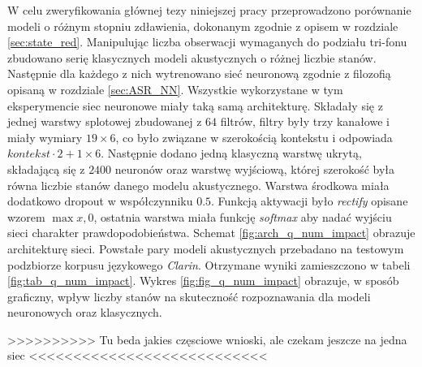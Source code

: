 \documentclass[11pt]{article}
\begin{document}
		W celu zweryfikowania głównej tezy niniejszej pracy przeprowadzono porównanie modeli o różnym stopniu zdławienia, dokonanym zgodnie z opisem w rozdziale \ref{sec:state_red}. Manipulując liczba obserwacji wymaganych do podziału tri-fonu zbudowano serię klasycznych modeli akustycznych o różnej liczbie stanów. Następnie dla każdego z nich wytrenowano sieć neuronową zgodnie z filozofią opisaną w rozdziale \ref{sec:ASR_NN}. Wszystkie wykorzystane w tym eksperymencie siec neuronowe miały taką samą architekturę. Składały się z jednej warstwy splotowej zbudowanej z $64$ filtrów, filtry były trzy kanałowe i miały wymiary $19\times6$, co było związane w szerokością kontekstu i odpowiada $kontekst \cdot 2 + 1\times6$. Następnie dodano jedną klasyczną warstwę ukrytą, składającą się z $2400$ neuronów oraz warstwę wyjściową, której szerokość była równa liczbie stanów danego modelu akustycznego. Warstwa środkowa miała dodatkowo dropout w współczynniku $0.5$. Funkcją aktywacji było \textit{rectify} opisane wzorem $\max{x,0}$, ostatnia warstwa miała funkcję \textit{softmax} aby nadać wyjściu sieci charakter prawdopodobieństwa. Schemat \ref{fig:arch_q_num_impact} obrazuje architekturę sieci. Powstałe pary modeli akustycznych przebadano na testowym podzbiorze korpusu językowego \textit{Clarin}. Otrzymane wyniki zamieszczono w tabeli \ref{fig:tab_q_num_impact}. Wykres \ref{fig:fig_q_num_impact} obrazuje, w sposób graficzny, wpływ liczby stanów na skuteczność rozpoznawania dla modeli neuronowych oraz klasycznych.
		
		>>>>>>>>>>  Tu beda jakies częsciowe wnioski, ale czekam jeszcze na jedna siec <<<<<<<<<<<<<<<<<<<<<<<<<<<
		
\end{document}
